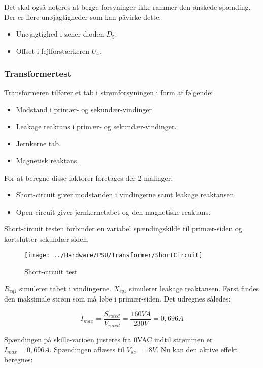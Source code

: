 Det skal også noteres at begge forsyninger ikke rammer den ønskede spænding. Der er flere unøjagtigheder som kan påvirke dette:
\begin{itemize}
\item Unøjagtighed i zener-dioden $D_5$.
\item Offset i fejlforstærkeren $U_4$.
\end{itemize}


\subsubsection{Transformertest}
Transformeren tilfører et tab i strømforsyningen i form af følgende:
\begin{itemize}
\item Modstand i primær- og sekundær-vindinger
\item Leakage reaktans i primær- og sekundær-vindinger.
\item Jernkerne tab.
\item Magnetisk reaktans.
\end{itemize}


For at beregne disse faktorer foretages der 2 målinger:
\begin{itemize}
\item Short-circuit giver modstanden i vindingerne samt leakage reaktansen.
\item Open-circuit giver jernkernetabet og den magnetiske reaktans.
\end{itemize}


Short-circuit testen forbinder en variabel spændingskilde til primær-siden og kortslutter sekundær-siden.

\begin{figure}[H]
	\centering
	\texttt{[image: ../Hardware/PSU/Transformer/ShortCircuit]}
	\caption{Short-circuit test}
	\label{photo:ShortCircuit}
\end{figure}

$R_{eq1}$ simulerer tabet i vindingerne. $X_{eq1}$ simulerer leakage reaktansen. Først findes den maksimale strøm som må løbe i primær-siden. Det udregnes således:

\begin{equation}
	I_{max} = \frac{S_{rated}}{V_{rated}} = \frac{160VA}{230V} = 0,696A
\end{equation} 


Spændingen på skille-varioen justeres fra 0VAC indtil strømmen er $I_{max} = 0,696A$. Spændingen aflæses til $V_{sc} = 18V$. Nu kan den aktive effekt beregnes:

